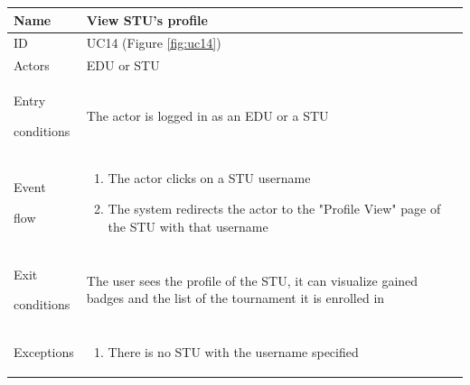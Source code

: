 \begin{center}
    \def\arraystretch{1.5}
    \begin{tabular}{| m{2cm} | m{10cm}|}
        \hline
        Name                  & View STU's profile                                                                                                      \\ \hline
        ID                    & UC14 (Figure \ref{fig:uc14})                                                                                            \\ \hline
        Actors                & EDU or STU                                                                                                              \\ \hline
        Entry \par conditions & The actor is logged in as an EDU or a STU                                                                               \\ \hline
        Event \par flow       & \begin{enumerate}
                                    \item The actor clicks on a STU username
                                    \item The system redirects the actor to the "Profile View" page of the STU with that username
                                \end{enumerate}                                                                                                         \\ \hline
        Exit \par conditions  & The user sees the profile of the STU, it can visualize gained badges and the list of the tournament it is enrolled in    \\ \hline
        Exceptions            & \begin{enumerate}
                                    \item There is no STU with the username specified
                                \end{enumerate}                                                                                                         \\ \hline
    \end{tabular}
\end{center}

